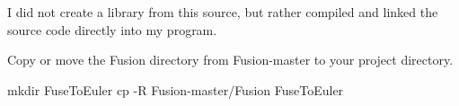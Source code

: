 \begin{DoxyParagraph}{}
I did not create a library from this source, but rather compiled and linked the source code directly into my program. 
\end{DoxyParagraph}
\begin{DoxyParagraph}{}
Copy or move the Fusion directory from Fusion-\/master to your project directory. 
\begin{DoxyCode}
mkdir FuseToEuler
cp -R Fusion-master/Fusion FuseToEuler
\end{DoxyCode}
 
\end{DoxyParagraph}
